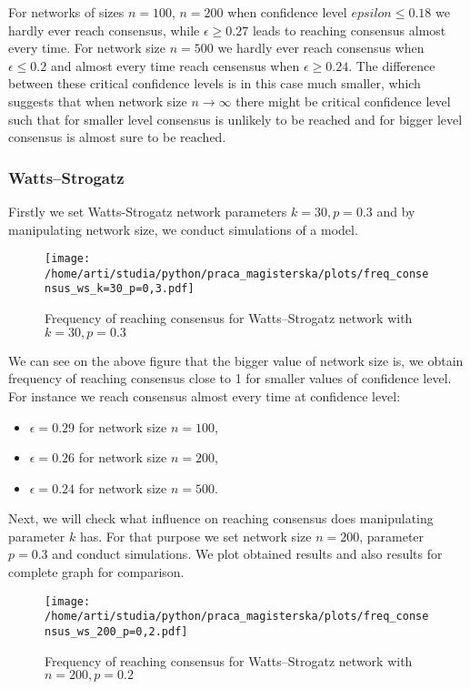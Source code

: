 \documentclass{article}
\begin{document}
For networks of sizes $n=100$, $n=200$ when confidence level $epsilon\leq0.18$ we hardly ever reach consensus, while $\epsilon\geq0.27$ leads to reaching consensus almost every time.
For network size $n=500$ we hardly ever reach consensus when $\epsilon\leq0.2$ and almost every time reach censensus when $\epsilon\geq0.24$. The difference between these critical confidence levels is in this case much smaller, which suggests that when network size $n \to \infty$ there might be critical confidence level such that for smaller level consensus is unlikely to be reached and for bigger level consensus is almost sure to be reached. 

\subsubsection{Watts--Strogatz}

Firstly we set Watts-Strogatz network parameters $k=30, p=0.3$ and by manipulating network size, we conduct simulations of a model.

\begin{figure}[H]
		\centering
		\texttt{[image: /home/arti/studia/python/praca\_magisterska/plots/freq\_consensus\_ws\_k=30\_p=0,3.pdf]}
		\caption{Frequency of reaching consensus for Watts--Strogatz network with $k=30, p=0.3$}
\end{figure}

We can see on the above figure that the bigger value of network size is, we obtain frequency of reaching consensus close to 1 for smaller values of confidence level. For instance we reach consensus almost every time at confidence level:
\begin{itemize}
\item  $\epsilon=0.29$ for network size $n=100$,
\item  $\epsilon=0.26$ for network size $n=200$,
\item  $\epsilon=0.24$ for network size $n=500$.
\end{itemize}
\indent

Next, we will check what influence on reaching consensus does manipulating parameter $k$ has. For that purpose we set network size $n=200$, parameter $p=0.3$ and conduct simulations. We plot obtained results and also results for complete graph for comparison.

\begin{figure}[H]
		\centering
		\texttt{[image: /home/arti/studia/python/praca\_magisterska/plots/freq\_consensus\_ws\_200\_p=0,2.pdf]}
		\caption{Frequency of reaching consensus for Watts--Strogatz network with $n=200, p=0.2$}
		\label{freq_ws}
\end{figure}
\end{document}
